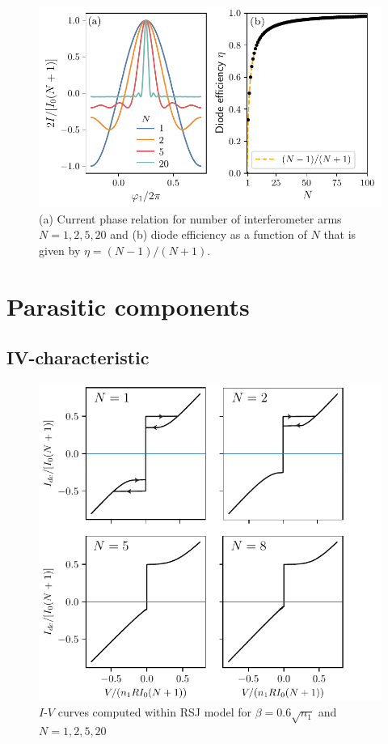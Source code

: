 \documentclass[aps,rsi,reprint,amsmath,amssymb,floatfix,longbibliography,superscriptaddress]{revtex4-1}
\begin{document}
\begin{figure}[t]
	\centering
	\includegraphics[width=\columnwidth]{gen-snail-efficiency2.pdf}
	\caption{(a) Current phase relation for number of
	interferometer arms $N=1,2,5,20$ and (b) diode efficiency as a
	function of $N$ that is given by $\eta=(N-1)/(N+1)$.}
	\label{fig:efficiency}
\end{figure}



\section{Parasitic components}
\label{sec:parasites}
\subsection{IV-characteristic}
\begin{figure}[t]
	\centering
	\includegraphics[width=\columnwidth]{rsj.pdf}
	\caption{$I$-$V$ curves computed within RSJ model for
	$\beta=0.6\sqrt{n_1}$ and $N=1,2,5,20$}
	\label{fig:rsj}
\end{figure}
\end{document}
